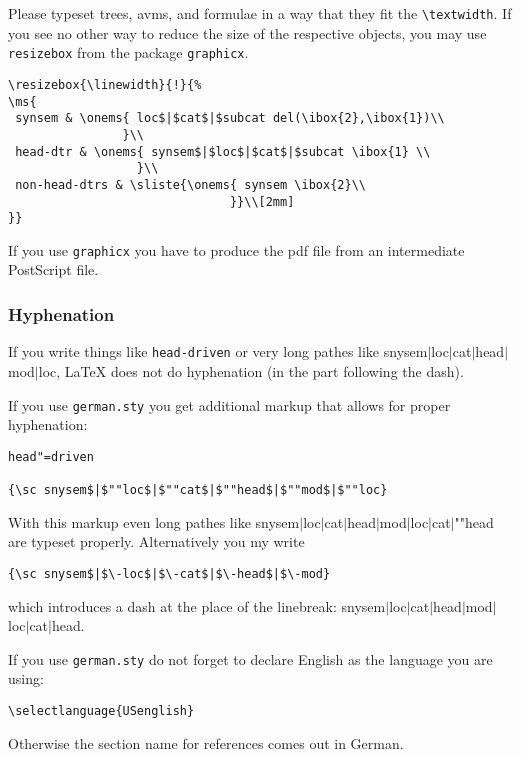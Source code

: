 \documentclass[11pt,a4paper,fleqn]{article}
\begin{document}
Please typeset trees, avms, and formulae in a way that they fit the
\verb+\textwidth+. If you see no other way to reduce the size of the respective
objects, you may use \verb+resizebox+ from the package \verb+graphicx+.
{\small
\begin{verbatim}
\resizebox{\linewidth}{!}{%
\ms{
 synsem & \onems{ loc$|$cat$|$subcat del(\ibox{2},\ibox{1})\\
                }\\
 head-dtr & \onems{ synsem$|$loc$|$cat$|$subcat \ibox{1} \\
                  }\\
 non-head-dtrs & \sliste{\onems{ synsem \ibox{2}\\ 
                               }}\\[2mm]
}}
\end{verbatim}
}

If you use \verb+graphicx+ you have to produce the pdf file from
an intermediate PostScript file.

\subsubsection{Hyphenation}
\label{hyphenation}

If you write things like \verb+head-driven+ or very long pathes like
{\sc snysem$|$loc$|$cat$|$head$|$mod$|$loc}, \LaTeX{} does not do hyphenation
(in the part following the dash).

If you use \verb+german.sty+ you get additional markup that allows for proper hyphenation:
\begin{verbatim}
head"=driven

{\sc snysem$|$""loc$|$""cat$|$""head$|$""mod$|$""loc}
\end{verbatim}
With this markup even long pathes like {\sc snysem$|$loc$|$cat$|$head$|$mod$|$loc$|$cat$|$""head}
are typeset properly. Alternatively you my write
\begin{verbatim}
{\sc snysem$|$\-loc$|$\-cat$|$\-head$|$\-mod}
\end{verbatim}
which introduces a dash at the place of the linebreak:
{\sc snysem$|$\-loc$|$\-cat$|$\-head$|$\-mod$|$\-loc$|$\-cat$|$\-head}.

If you use \verb+german.sty+ do not forget to declare English as the language
you are using:
\begin{verbatim}
\selectlanguage{USenglish}
\end{verbatim}
Otherwise the section name for references comes out in German.
\end{document}

